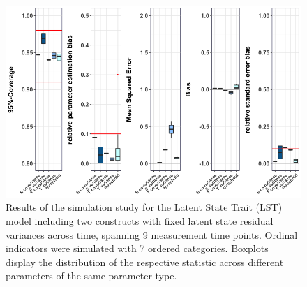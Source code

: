  \begin{figure}[H]
 \begin{adjustwidth}{-1cm}{-1cm}
    \begin{center}
  \includegraphics[width=1\textwidth]{Boxplot_LST_2constructs_fixed.png}
   \end{center}
    \end{adjustwidth}
      \captionsetup{skip=10pt,width=1.05\textwidth}
\caption[Results LST fixed variance two constructs]{Results of the simulation study for the Latent State Trait (LST) model including two constructs with fixed latent state residual variances across time, spanning 9 measurement time points.  Ordinal indicators were simulated with 7 ordered categories. Boxplots display the distribution of the respective statistic across different parameters of the same parameter type.}
\label{Fig: LST two fixed}
\end{figure}


